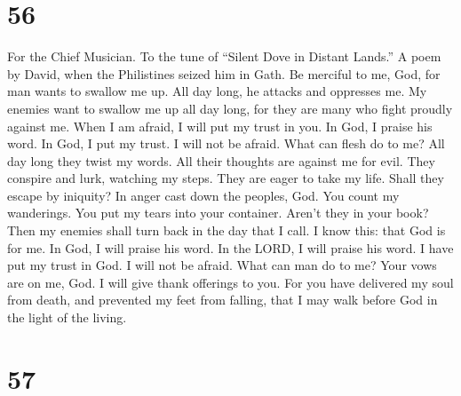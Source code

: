 \hypertarget{section-55}{%
\section{56}\label{section-55}}

For the Chief Musician. To the tune of ``Silent Dove in Distant Lands.''
A poem by David, when the Philistines seized him in Gath. 
Be merciful to me, God, for man wants to swallow me up. All day long, he
attacks and oppresses me.  My enemies want to swallow me
up all day long, for they are many who fight proudly against me.
 When I am afraid, I will put my trust in you.
 In God, I praise his word. In God, I put my trust. I will
not be afraid. What can flesh do to me?  All day long they
twist my words. All their thoughts are against me for evil.
 They conspire and lurk, watching my steps. They are eager
to take my life.  Shall they escape by iniquity? In anger
cast down the peoples, God.  You count my wanderings. You
put my tears into your container. Aren't they in your book?
 Then my enemies shall turn back in the day that I call. I
know this: that God is for me.  In God, I will praise his
word. In the LORD, I will praise his word.  I have put my
trust in God. I will not be afraid. What can man do to me?
 Your vows are on me, God. I will give thank offerings to
you.  For you have delivered my soul from death, and
prevented my feet from falling, that I may walk before God in the light
of the living.

\hypertarget{section-56}{%
\section{57}\label{section-56}}

